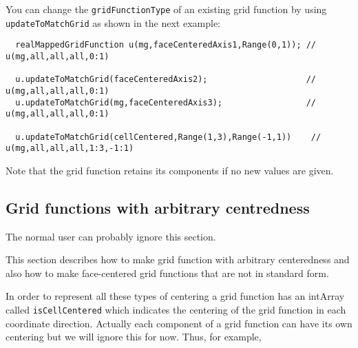 You can change the {\tt gridFunctionType} of an existing grid function by using {\tt updateToMatchGrid}
as shown in the next example:
{\footnotesize  
\begin{verbatim} 
  realMappedGridFunction u(mg,faceCenteredAxis1,Range(0,1)); // u(mg,all,all,all,0:1)

  u.updateToMatchGrid(faceCenteredAxis2);                    // u(mg,all,all,all,0:1)
  u.updateToMatchGrid(mg,faceCenteredAxis3);                 // u(mg,all,all,all,0:1)

  u.updateToMatchGrid(cellCentered,Range(1,3),Range(-1,1))    // u(mg,all,all,all,1:3,-1:1)
\end{verbatim}
}
\noindent Note that the grid function retains its components if no new values are given.
  








\subsection{Grid functions with arbitrary centredness}

The normal user can probably ignore this section.

This section describes how to make grid function with arbitrary centeredness and also
how to make face-centered grid functions that are not in standard form.

In order to represent all these types of centering a grid function has an intArray
called {\tt isCellCentered} which indicates the centering of the grid function
in each coordinate direction. Actually each component of a grid function can have
its own centering but we will ignore this for now.
Thus, for example,

